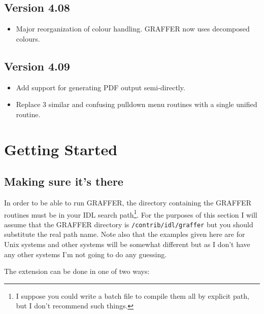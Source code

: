 \documentclass[11pt,twoside,english]{article}
\begin{document}
\subsection{Version 4.08}
\label{sec:v408}

\begin{itemize}
\item Major reorganization of colour handling. GRAFFER now uses
  decomposed colours. 
\end{itemize}

\subsection{Version 4.09}
\label{sec:v409}

\begin{itemize}
\item Add support for generating PDF output semi-directly.
\item Replace 3 similar and confusing pulldown menu routines with a
  single unified routine.
\end{itemize}
\section{Getting Started}


\subsection{Making sure it's there}

In order to be able to run GRAFFER, the directory containing the
GRAFFER routines must be in your IDL search path\footnote{I suppose you
  could write a batch file to compile them all by explicit path, but I
  don't recommend such things.}. For the purposes of this section I
will assume that the GRAFFER directory is \texttt{/contrib/idl/graffer}
but you should substitute the real path name. Note also that the
examples given here are for Unix systems and other systems will be
somewhat different but as I don't have any other systems I'm not going
to do any guessing.

The extension can be done in one of two ways:
\end{document}
